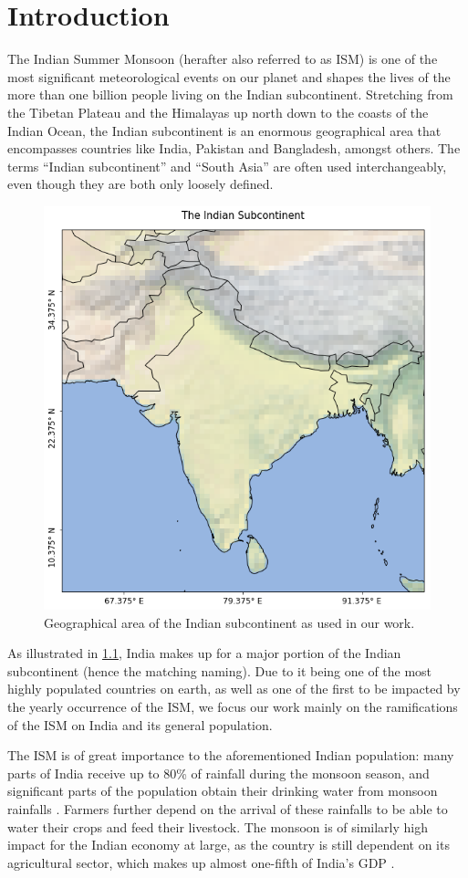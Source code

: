 \chapter{Introduction}
\label{c:introduction}

The Indian Summer Monsoon (herafter also referred to as ISM) is one of the most significant meteorological events on our planet and shapes the lives of the more than one billion people living on the Indian subcontinent. Stretching from the Tibetan Plateau and the Himalayas up north down to the coasts of the Indian Ocean, the Indian subcontinent is an enormous geographical area that encompasses countries like India, Pakistan and Bangladesh, amongst others. The terms ``Indian subcontinent'' and ``South Asia'' are often used interchangeably, even though they are both only loosely defined.

\begin{figure}[h]
  \centering
  \includegraphics[width=0.4\linewidth]{./99_appendix/img/area_overview}
  \caption{Geographical area of the Indian subcontinent as used in our work.}
  \label{fig:the_indian_subcontinent}
\end{figure}

As illustrated in \cref{fig:the_indian_subcontinent}, India makes up for a major portion of the Indian subcontinent (hence the matching naming). Due to it being one of the most highly populated countries on earth, as well as one of the first to be impacted by the yearly occurrence of the ISM, we focus our work mainly on the ramifications of the ISM on India and its general population.

The ISM is of great importance to the aforementioned Indian population: many parts of India receive up to 80\% of rainfall during the monsoon season, and significant parts of the population obtain their drinking water from monsoon rainfalls \citep{Stolbova.2015}. Farmers further depend on the arrival of these rainfalls to be able to water their crops and feed their livestock. The monsoon is of similarly high impact for the Indian economy at large, as the country is still dependent on its agricultural sector, which makes up almost one-fifth of India's GDP \citep{CentralIntelligenceAgency.05.01.2018}.

